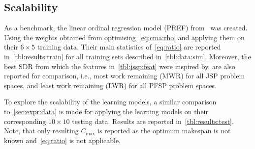 \documentclass[a4paper,twoside]{article}
\begin{document}
\subsection{Scalability}\label{sec:expr:scalability} 
As a benchmark, the linear ordinal regression model (PREF) from~\cite{InRu11a} was created.
Using the weights obtained from optimising~\cref{eq:cma:rho} and applying them on their  $6\times5$ training data. Their main statistics of~\cref{eq:ratio} are reported in~\cref{tbl:results:train} for all training sets described in~\cref{tbl:data:sim}. Moreover, the best SDR from which the features in~\cref{tbl:jssp:feat} were inspired by, are also reported for comparison, i.e., most work remaining (MWR) for all JSP problem spaces, and least work remaining (LWR) for all PFSP problem spaces.

To explore the scalability of the learning models, a similar comparison to~\cref{sec:expr:data} is made for applying the learning models on their corresponding $10\times10$ testing data. Results are reported in~\cref{tbl:results:test}. Note, that only resulting $C_{\max}$ is reported as the optimum makespan is not known and~\cref{eq:ratio} is not applicable. 
\end{document}
